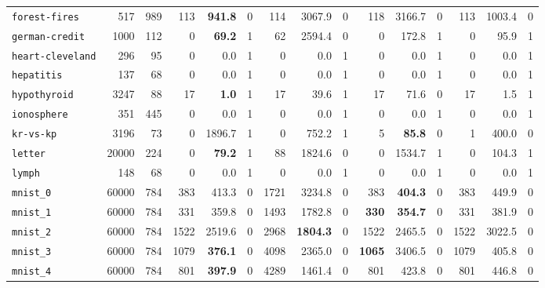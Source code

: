 \begin{tabular}{lccrrrrrrrrrrrr}
\texttt{forest-fires} & \multicolumn{1}{r}{517} & \multicolumn{1}{r}{989}  & 113 & \textbf{941.8} & 0 & 114 & 3067.9 & 0 & 118 & 3166.7 & 0 & 113 & 1003.4 & 0\\
\texttt{german-credit} & \multicolumn{1}{r}{1000} & \multicolumn{1}{r}{112}  & 0 & \textbf{69.2} & 1 & 62 & 2594.4 & 0 & 0 & 172.8 & 1 & 0 & 95.9 & 1\\
\texttt{heart-cleveland} & \multicolumn{1}{r}{296} & \multicolumn{1}{r}{95}  & 0 & 0.0 & 1 & 0 & 0.0 & 1 & 0 & 0.0 & 1 & 0 & 0.0 & 1\\
\texttt{hepatitis} & \multicolumn{1}{r}{137} & \multicolumn{1}{r}{68}  & 0 & 0.0 & 1 & 0 & 0.0 & 1 & 0 & 0.0 & 1 & 0 & 0.0 & 1\\
\texttt{hypothyroid} & \multicolumn{1}{r}{3247} & \multicolumn{1}{r}{88}  & 17 & \textbf{1.0} & 1 & 17 & 39.6 & 1 & 17 & 71.6 & 0 & 17 & 1.5 & 1\\
\texttt{ionosphere} & \multicolumn{1}{r}{351} & \multicolumn{1}{r}{445}  & 0 & 0.0 & 1 & 0 & 0.0 & 1 & 0 & 0.0 & 1 & 0 & 0.0 & 1\\
\texttt{kr-vs-kp} & \multicolumn{1}{r}{3196} & \multicolumn{1}{r}{73}  & 0 & 1896.7 & 1 & 0 & 752.2 & 1 & 5 & \textbf{85.8} & 0 & 1 & 400.0 & 0\\
\texttt{letter} & \multicolumn{1}{r}{20000} & \multicolumn{1}{r}{224}  & 0 & \textbf{79.2} & 1 & 88 & 1824.6 & 0 & 0 & 1534.7 & 1 & 0 & 104.3 & 1\\
\texttt{lymph} & \multicolumn{1}{r}{148} & \multicolumn{1}{r}{68}  & 0 & 0.0 & 1 & 0 & 0.0 & 1 & 0 & 0.0 & 1 & 0 & 0.0 & 1\\
\texttt{mnist\_0} & \multicolumn{1}{r}{60000} & \multicolumn{1}{r}{784}  & 383 & 413.3 & 0 & 1721 & 3234.8 & 0 & 383 & \textbf{404.3} & 0 & 383 & 449.9 & 0\\
\texttt{mnist\_1} & \multicolumn{1}{r}{60000} & \multicolumn{1}{r}{784}  & 331 & 359.8 & 0 & 1493 & 1782.8 & 0 & \textbf{330} & \textbf{354.7} & 0 & 331 & 381.9 & 0\\
\texttt{mnist\_2} & \multicolumn{1}{r}{60000} & \multicolumn{1}{r}{784}  & 1522 & 2519.6 & 0 & 2968 & \textbf{1804.3} & 0 & 1522 & 2465.5 & 0 & 1522 & 3022.5 & 0\\
\texttt{mnist\_3} & \multicolumn{1}{r}{60000} & \multicolumn{1}{r}{784}  & 1079 & \textbf{376.1} & 0 & 4098 & 2365.0 & 0 & \textbf{1065} & 3406.5 & 0 & 1079 & 405.8 & 0\\
\texttt{mnist\_4} & \multicolumn{1}{r}{60000} & \multicolumn{1}{r}{784}  & 801 & \textbf{397.9} & 0 & 4289 & 1461.4 & 0 & 801 & 423.8 & 0 & 801 & 446.8 & 0\\

\end{tabular}
